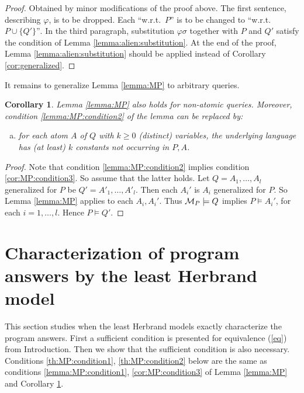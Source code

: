 \documentclass[a4paper]{tlp2}
\newtheorem{corollary}[theorem]{Corollary}
\newcommand*{\seq}[2][n]  {{#2_{1}, \allowbreak \ldots, \allowbreak #2_{#1}}}
\newcommand*{\M}{{\ensuremath{\cal M}}\xspace}
\begin{document}
\begin{proof}
Obtained by minor modifications of the proof above.
The first sentence, describing $\varphi$, is to be dropped.
Each ``w.r.t.\ $P$'' is to be changed to ``w.r.t.\ $P\cup\{Q'\}$''$\!$.
In the third paragraph, substitution $\varphi\sigma$ together with $P$ and
$Q'$ satisfy the condition of Lemma \ref{lemma:alien:substitution}.
At the end of the proof, 
Lemma \ref{lemma:alien:substitution} should be applied instead of 
Corollary \ref{cor:generalized}.
\end{proof}





It remains to generalize Lemma \ref{lemma:MP} to arbitrary queries.

\begin{corollary}
\label{cor:MP}
Lemma \ref{lemma:MP} also holds for non-atomic queries.  Moreover, condition
\ref{lemma:MP:condition2} of the lemma can be replaced by:
\begin{enumerate}[(a)]
\setcounter{enumi}2
\item
\label{cor:MP:condition3}
for each atom $A$ of $Q$ with  $k\geq0$ (distinct) variables,
the underlying language has (at least) $k$ constants not occurring in $P,A$.
\end{enumerate}
\end{corollary}

\begin{proof}
Note that condition \ref{lemma:MP:condition2} implies condition
\ref{cor:MP:condition3}.
So assume that the latter holds.
Let  $Q=\seq[l]A$ generalized for $P$ be $Q'=\seq[l]{A'}$.
Then each $A_i'$ is $A_i$  generalized for $P$.
So Lemma \ref{lemma:MP} applies to each $A_i,A_i'$.  Thus $\M_P\models Q$ implies
$P\models A_i'$, for each $i=1,\ldots,l$.
Hence $P\models Q'$.
\end{proof}








\section{Characterization of program answers by the least Herbrand model}
\label{sec:H}

This section studies when the least Herbrand models exactly characterize the
program answers. 
First a sufficient condition is presented for equivalence (\ref{eq}) from
Introduction.
Then we show that the sufficient condition is also necessary.
Conditions \ref{th:MP:condition1}, \ref{th:MP:condition2} below are the same
as conditions \ref{lemma:MP:condition1}, \ref{cor:MP:condition3}
 of Lemma \ref{lemma:MP} and  Corollary \ref{cor:MP}.
\end{document}

